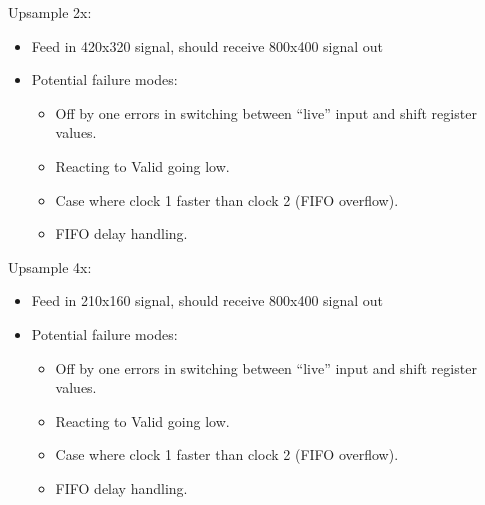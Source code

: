 \documentclass[11pt]{article}
\begin{document}
\noindent Upsample 2x:
\begin{itemize}
    \item Feed in 420x320 signal, should receive 800x400 signal out
    \item Potential failure modes:
        \begin{itemize}
            \item Off by one errors in switching between ``live'' input and shift register values.
            \item Reacting to Valid going low.
            \item Case where clock 1 faster than clock 2 (FIFO overflow).
            \item FIFO delay handling.
        \end{itemize}
\end{itemize}


\noindent Upsample 4x:
\begin{itemize}
    \item Feed in 210x160 signal, should receive 800x400 signal out
    \item Potential failure modes:
        \begin{itemize}
            \item Off by one errors in switching between ``live'' input and shift register values.
            \item Reacting to Valid going low.
            \item Case where clock 1 faster than clock 2 (FIFO overflow).
            \item FIFO delay handling.
        \end{itemize}
\end{itemize}
\end{document}

